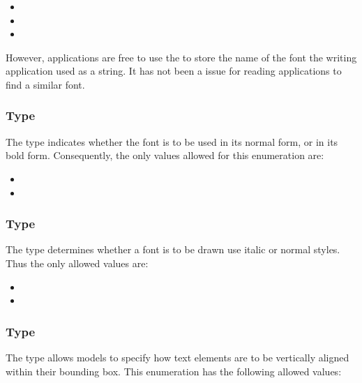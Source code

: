 \begin{itemize}
 \item {}
 \item {}
 \item {}
\end{itemize}

However, applications are free to use the \FontFamily to store the name of the font the writing application used as a string. It has not been a issue for reading applications to find a similar font. 

\subsubsection{Type \fixttspace{}}
The type \FontWeight indicates whether the font is to be used in its normal form, or in its bold form. Consequently, the only values allowed for this enumeration are: 

\begin{itemize}
 \item {} 
 \item {} 
\end{itemize}

\subsubsection{Type \fixttspace{}}

The type \FontStyle determines whether a font is to be
drawn use italic or normal styles. Thus the only allowed values are:

\begin{itemize}
 \item {} 
 \item {} 
\end{itemize}

\subsubsection{Type \fixttspace{}}

The type \VTextAnchor allows models to specify how text elements are to be
vertically aligned within their bounding box. This enumeration has the following allowed values: 


